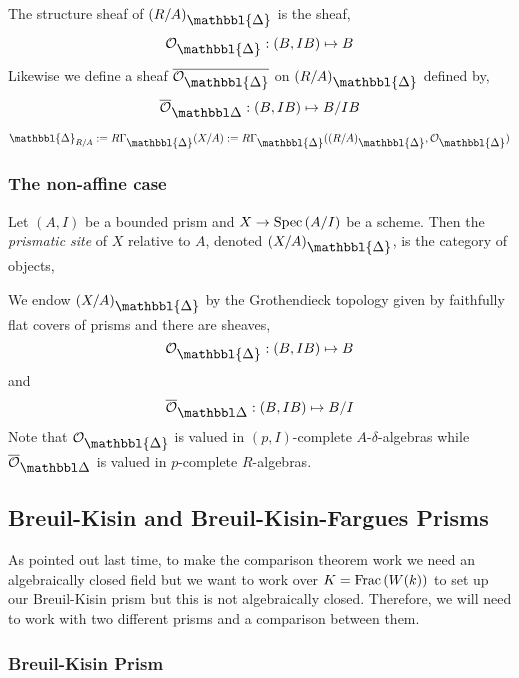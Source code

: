 \documentclass[12pt]{article}
\newcommand{\Prism}{{\mathlarger{\mathbbl{\Delta}}}}
\begin{document}
\begin{defn}
The structure sheaf of $(R/A)_{\Prism}$ is the sheaf,
\[ \struct{\Prism} : (B, IB) \mapsto B \]
Likewise we define a sheaf $\ol{\struct{\Prism}}$ on $(R/A)_{\Prism}$ defined by,
\[ \barOpris : (B, IB) \mapsto B / I B \]
\end{defn}

\begin{defn}
$\Prism_{R/A} := R \Gamma_{\Prism}(X/A) := R \Gamma_{\Prism}((R/A)_{\Prism}, \struct{\Prism})$
\end{defn}

\subsubsection{The non-affine case}


\begin{defn}
Let $(A, I)$ be a bounded prism and $X \to \mathrm{Spec}\left( A/I \right)$ be a scheme. Then the \textit{prismatic site} of $X$ relative to $A$, denoted $(X/A)_{\Prism}$, is the category of objects,
\begin{center}
\end{center}
We endow $(X/A)_{\Prism}$ by the Grothendieck topology given by faithfully flat covers of prisms and there are sheaves,
\[ \struct{\Prism} : (B, IB) \mapsto B \]
and 
\[ \barOpris : (B, IB) \mapsto B/I \]
Note that $\struct{\Prism}$ is valued in $(p,I)$-complete $A$-$\delta$-algebras while $\barOpris$ is valued in $p$-complete $R$-algebras.
\end{defn}

\subsection{Breuil-Kisin and Breuil-Kisin-Fargues Prisms}



As pointed out last time, to make the \etale comparison theorem work we need an algebraically closed field but we want to work over $K = \mathrm{Frac}\left(W(k)\right)$ to set up our Breuil-Kisin prism but this is not algebraically closed. Therefore, we will need to work with two different prisms and a comparison between them.

\subsubsection{Breuil-Kisin Prism}
\end{document}
